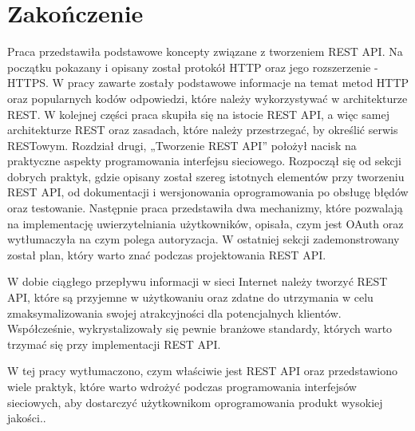 \chapter*{Zakończenie}
Praca przedstawiła podstawowe koncepty związane z tworzeniem REST API. Na początku pokazany i opisany został protokół HTTP oraz jego rozszerzenie - HTTPS. W pracy zawarte zostały podstawowe informacje na temat metod HTTP oraz popularnych kodów odpowiedzi, które należy wykorzystywać w architekturze REST. W kolejnej części praca skupiła się na istocie REST API, a więc samej architekturze REST oraz zasadach, które należy przestrzegać, by określić serwis RESTowym. Rozdział drugi, „Tworzenie REST API” położył nacisk na praktyczne aspekty programowania interfejsu sieciowego. Rozpoczął się od sekcji dobrych praktyk, gdzie opisany został szereg istotnych elementów przy tworzeniu REST API, od dokumentacji i wersjonowania oprogramowania po obsługę błędów oraz testowanie. Następnie praca przedstawiła dwa mechanizmy, które pozwalają na implementację uwierzytelniania użytkowników, opisała, czym jest OAuth oraz wytłumaczyła na czym polega autoryzacja. W ostatniej sekcji zademonstrowany został plan, który warto znać podczas projektowania REST API.

W dobie ciągłego przepływu informacji w sieci Internet należy tworzyć REST API, które są przyjemne w użytkowaniu oraz zdatne do utrzymania w celu zmaksymalizowania swojej atrakcyjności dla potencjalnych klientów. Współcześnie, wykrystalizowały się pewnie branżowe standardy, których warto trzymać się przy implementacji REST API.

W tej pracy wytłumaczono, czym właściwie jest REST API oraz przedstawiono wiele praktyk, które warto wdrożyć podczas programowania interfejsów sieciowych, aby dostarczyć użytkownikom oprogramowania produkt wysokiej jakości..